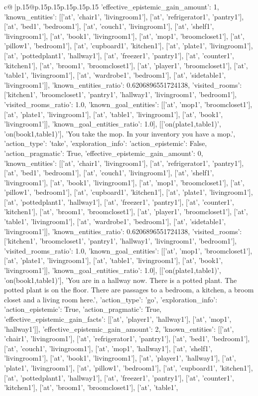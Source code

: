 \documentclass{article}
\begin{document}
{\begin{supertabular}{c@{$\;$}|p{.15\linewidth}@{}p{.15\linewidth}p{.15\linewidth}p{.15\linewidth}p{.15\linewidth}p{.15\linewidth}}
{{{'effective_epistemic_gain_amount': 1, 'known_entities': [['at', 'chair1', 'livingroom1'], ['at', 'refrigerator1', 'pantry1'], ['at', 'bed1', 'bedroom1'], ['at', 'couch1', 'livingroom1'], ['at', 'shelf1', 'livingroom1'], ['at', 'book1', 'livingroom1'], ['at', 'mop1', 'broomcloset1'], ['at', 'pillow1', 'bedroom1'], ['at', 'cupboard1', 'kitchen1'], ['at', 'plate1', 'livingroom1'], ['at', 'pottedplant1', 'hallway1'], ['at', 'freezer1', 'pantry1'], ['at', 'counter1', 'kitchen1'], ['at', 'broom1', 'broomcloset1'], ['at', 'player1', 'broomcloset1'], ['at', 'table1', 'livingroom1'], ['at', 'wardrobe1', 'bedroom1'], ['at', 'sidetable1', 'livingroom1']], 'known_entities_ratio': 0.6206896551724138, 'visited_rooms': ['kitchen1', 'broomcloset1', 'pantry1', 'hallway1', 'livingroom1', 'bedroom1'], 'visited_rooms_ratio': 1.0, 'known_goal_entities': [['at', 'mop1', 'broomcloset1'], ['at', 'plate1', 'livingroom1'], ['at', 'table1', 'livingroom1'], ['at', 'book1', 'livingroom1']], 'known_goal_entities_ratio': 1.0}}], [['on(plate1,table1)', 'on(book1,table1)'], 'You take the mop. In your inventory you have a mop.', {'action_type': 'take', 'exploration_info': {'action_epistemic': False, 'action_pragmatic': True, 'effective_epistemic_gain_amount': 0, 'known_entities': [['at', 'chair1', 'livingroom1'], ['at', 'refrigerator1', 'pantry1'], ['at', 'bed1', 'bedroom1'], ['at', 'couch1', 'livingroom1'], ['at', 'shelf1', 'livingroom1'], ['at', 'book1', 'livingroom1'], ['at', 'mop1', 'broomcloset1'], ['at', 'pillow1', 'bedroom1'], ['at', 'cupboard1', 'kitchen1'], ['at', 'plate1', 'livingroom1'], ['at', 'pottedplant1', 'hallway1'], ['at', 'freezer1', 'pantry1'], ['at', 'counter1', 'kitchen1'], ['at', 'broom1', 'broomcloset1'], ['at', 'player1', 'broomcloset1'], ['at', 'table1', 'livingroom1'], ['at', 'wardrobe1', 'bedroom1'], ['at', 'sidetable1', 'livingroom1']], 'known_entities_ratio': 0.6206896551724138, 'visited_rooms': ['kitchen1', 'broomcloset1', 'pantry1', 'hallway1', 'livingroom1', 'bedroom1'], 'visited_rooms_ratio': 1.0, 'known_goal_entities': [['at', 'mop1', 'broomcloset1'], ['at', 'plate1', 'livingroom1'], ['at', 'table1', 'livingroom1'], ['at', 'book1', 'livingroom1']], 'known_goal_entities_ratio': 1.0}}], [['on(plate1,table1)', 'on(book1,table1)'], 'You are in a hallway now. There is a potted plant. The potted plant is on the floor. There are passages to a bedroom, a kitchen, a broom closet and a living room here.', {'action_type': 'go', 'exploration_info': {'action_epistemic': True, 'action_pragmatic': True, 'effective_epistemic_gain_facts': [['at', 'player1', 'hallway1'], ['at', 'mop1', 'hallway1']], 'effective_epistemic_gain_amount': 2, 'known_entities': [['at', 'chair1', 'livingroom1'], ['at', 'refrigerator1', 'pantry1'], ['at', 'bed1', 'bedroom1'], ['at', 'couch1', 'livingroom1'], ['at', 'mop1', 'hallway1'], ['at', 'shelf1', 'livingroom1'], ['at', 'book1', 'livingroom1'], ['at', 'player1', 'hallway1'], ['at', 'plate1', 'livingroom1'], ['at', 'pillow1', 'bedroom1'], ['at', 'cupboard1', 'kitchen1'], ['at', 'pottedplant1', 'hallway1'], ['at', 'freezer1', 'pantry1'], ['at', 'counter1', 'kitchen1'], ['at', 'broom1', 'broomcloset1'], ['at', 'table1', }}}
\end{supertabular}}
\end{document}

